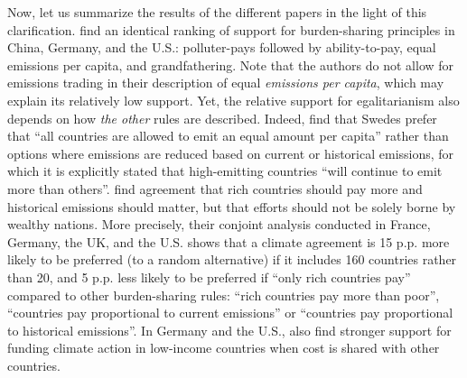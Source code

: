 Now, let us summarize the results of the different papers in the light of this clarification. 
\citet{schleich_citizens_2016} find an identical ranking of support for burden-sharing principles in China, Germany, and the U.S.: polluter-pays followed by ability-to-pay, equal emissions per capita, and grandfathering. 
Note that the authors do not allow for emissions trading in their description of equal \textit{emissions per capita}, which may explain its relatively low support. 
Yet, the relative support for egalitarianism also depends on how \textit{the other} rules are described. Indeed, \citet{carlsson_is_2011} find that Swedes prefer that ``all countries are allowed to emit an equal amount per capita'' rather than options where emissions are reduced based on current or historical emissions, for which it is explicitly stated that high-emitting countries ``will continue to emit more than others''. 
\citet{bechtel_mass_2013} find agreement that rich countries should pay more and historical emissions should matter, but that efforts should not be solely borne by wealthy nations. More precisely, their conjoint analysis conducted in France, Germany, the UK, and the U.S. shows that a climate agreement is 15 p.p. more likely to be preferred  (to a random alternative) if it includes 160 countries rather than 20, and 5 p.p. less likely to be preferred if ``only rich countries pay'' compared to other burden-sharing rules: ``rich countries pay more than poor'', ``countries pay proportional to current emissions'' or ``countries pay proportional to historical emissions''. In Germany and the U.S., \citet{gampfer_obtaining_2014} also find stronger support for funding climate action in low-income countries when cost is shared with other countries. %
